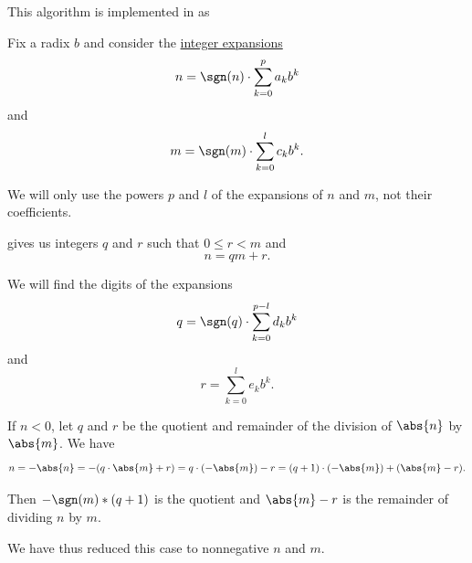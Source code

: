 \begin{comments}
  \item This algorithm is implemented in \cite{notebook:code} as
  \begin{CodeRefDisplay}
  \end{CodeRefDisplay}
\end{comments}

\begin{algorithm}\label{alg:long_integer_division}
  Fix a radix \( b \) and consider the \hyperref[def:integer_radix_expansion]{integer expansions}
  \begin{equation*}
    n = \sgn(n) \cdot \sum_{k=0}^p a_k b^k
  \end{equation*}
  and
  \begin{equation*}
    m = \sgn(m) \cdot \sum_{k=0}^l c_k b^k.
  \end{equation*}

  We will only use the powers \( p \) and \( l \) of the expansions of \( n \) and \( m \), not their coefficients.

   gives us integers \( q \) and \( r \) such that \( 0 \leq r < m \) and
  \begin{equation*}
    n = qm + r.
  \end{equation*}

  We will find the digits of the expansions
  \begin{equation*}
    q = \sgn(q) \cdot \sum_{k=0}^{p - l} d_k b^k
  \end{equation*}
  and
  \begin{equation*}
    r = \sum_{k=0}^l e_k b^k.
  \end{equation*}

  \begin{thmenum}
     If \( n < 0 \), let \( q \) and \( r \) be the quotient and remainder of the division of \( \abs{n} \) by \( \abs{m} \). We have
    \begin{equation*}
      n = -\abs{n} = -(q \cdot \abs{m} + r) = q \cdot (-\abs{m}) - r = (q + 1) \cdot (-\abs{m}) + (\abs{m} - r).
    \end{equation*}

    Then \( -\sgn(m) * (q + 1) \) is the quotient and \( \abs{m} - r \) is the remainder of dividing \( n \) by \( m \).

    We have thus reduced this case to nonnegative \( n \) and \( m \).


\end{thmenum}
\end{algorithm}
